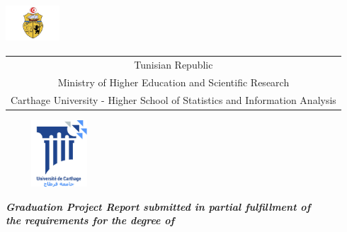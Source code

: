 \documentclass[a4paper, oneside, french, 12pt, final]{extreport}
\title{\reportSubject}
\author{\reportAuthor}
\newcommand{\reportTitle} {%
  \textsc{Graduation Project Report}
}
\newcommand{\studyDepartment} {%
  Entreprise d'accueil %
}
\newcommand{\ESSAI} {%
  Higher School of Statistics and Information Analysis
}
\begin{document}
\thispagestyle{empty}
\begin{titlepage}
\begin{center}


\includegraphics[width=2cm, height=1.5cm]{embleme.jpg}\\

{%
  \fontsize{9pt}{9pt}\selectfont%
  \begin{tabular}{c}
    Tunisian Republic\\
    Ministry of Higher Education and Scientific Research \\%
    Carthage University - \ESSAI{}  \\
  \end{tabular}
}

\vspace{10pt}
\includegraphics[width=4cm, height=2.5cm]{universite-carthage.jpg} \\


\vspace{10pt} {%
  \renewcommand*{\familydefault}{\defaultFont}
  \fontsize{46pt}{46pt}\selectfont%
}

\vspace{10pt}
\textbf{\textit{Graduation Project Report submitted in partial fulfillment of}}\\
\textbf{\textit{the requirements for the degree of}}\\


\end{center}
\end{titlepage}
\end{document}
